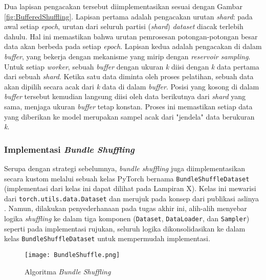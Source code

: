 Dua lapisan pengacakan tersebut diimplementasikan sesuai dengan Gambar \ref{fig:BufferedShuffling}. Lapisan pertama adalah pengacakan urutan \textit{shard}: pada awal setiap \textit{epoch}, urutan dari seluruh partisi (\textit{shard}) \textit{dataset} diacak terlebih dahulu. Hal ini memastikan bahwa urutan pemrosesan potongan-potongan besar data akan berbeda pada setiap \textit{epoch}. Lapisan kedua adalah pengacakan di dalam \textit{buffer}, yang bekerja dengan mekanisme yang mirip dengan \textit{reservoir sampling}. Untuk setiap \textit{worker}, sebuah \textit{buffer} dengan ukuran \textit{k} diisi dengan \textit{k} data pertama dari sebuah \textit{shard}. Ketika satu data diminta oleh proses pelatihan, sebuah data akan dipilih secara acak dari \textit{k} data di dalam \textit{buffer}. Posisi yang kosong di dalam \textit{buffer} tersebut kemudian langsung diisi oleh data berikutnya dari \textit{shard} yang sama, menjaga ukuran \textit{buffer} tetap konstan. Proses ini memastikan setiap data yang diberikan ke model merupakan sampel acak dari "jendela" data berukuran \textit{k}.

\subsubsection{Implementasi \textit{Bundle Shuffling}}
Serupa dengan strategi sebelumnya, \textit{bundle shuffling} juga diimplementasikan secara kustom melalui sebuah kelas PyTorch bernama \texttt{BundleShuffleDataset} (implementasi dari kelas ini dapat dilihat pada Lampiran X). Kelas ini mewarisi dari \texttt{torch.utils.data.Dataset} dan merujuk pada konsep dari publikasi aslinya \parencite{BundleShuffle}. Namun, dilakukan penyederhanaan pada tugas akhir ini, alih-alih menyebar logika \textit{shuffling} ke dalam tiga komponen (\texttt{Dataset}, \texttt{DataLoader}, dan \texttt{Sampler}) seperti pada implementasi rujukan, seluruh logika dikonsolidasikan ke dalam kelas \texttt{BundleShuffleDataset} untuk mempermudah implementasi.

\begin{figure}[t]
    \centering
    \texttt{[image: BundleShuffle.png]}
    \caption{Algoritma \textit{Bundle Shuffling}}
    \parencite{BundleShuffle}
    \label{fig:BundleShuffling}
\end{figure}

